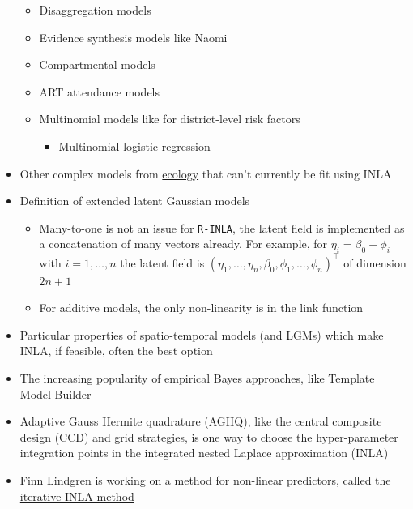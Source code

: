 \documentclass[a4paper, nobind]{templates/ociamthesis}
\providecommand{\tightlist}{%
  \setlength{\itemsep}{0pt}\setlength{\parskip}{0pt}}
\begin{document}
\begin{itemize}
  \begin{itemize}
  \tightlist
  \item
    Disaggregation models
  \item
    Evidence synthesis models like Naomi \autocite{eaton2021naomi,eaton2019joint}
  \item
    Compartmental models
  \item
    ART attendance models
  \item
    Multinomial models like for district-level risk factors

    \begin{itemize}
    \tightlist
    \item
      Multinomial logistic regression
    \end{itemize}
  \end{itemize}
\item
  Other complex models from \href{https://www.bioss.ac.uk/rsse/2013/September2013slides-Illian.pdf}{ecology} that can't currently be fit using INLA
\item
  Definition of extended latent Gaussian models \autocite{stringer2021fast}

  \begin{itemize}
  \tightlist
  \item
    Many-to-one is not an issue for \texttt{R-INLA}, the latent field is implemented as a concatenation of many vectors already. For example, for \(\eta_i = \beta_0 + \phi_i\) with \(i = 1, \ldots, n\) the latent field is \((\eta_1, \ldots, \eta_n, \beta_0, \phi_1, \ldots, \phi_n)^\top\) of dimension \(2n + 1\)
  \item
    For additive models, the only non-linearity is in the link function
  \end{itemize}
\item
  Particular properties of spatio-temporal models (and LGMs) which make INLA, if feasible, often the best option
\item
  The increasing popularity of empirical Bayes approaches, like Template Model Builder \autocite{osgoodzimmerman2021statistical}
\item
  Adaptive Gauss Hermite quadrature (AGHQ), like the central composite design (CCD) and grid strategies, is one way to choose the hyper-parameter integration points in the integrated nested Laplace approximation (INLA)
\item
  Finn Lindgren is working on a method for non-linear predictors, called the \href{https://github.com/inlabru-org/inlabru/blob/55896f10d563c14e34cab577b29b733aac051f86/vignettes/method.Rmd}{iterative INLA method}


\end{itemize}
\end{document}
